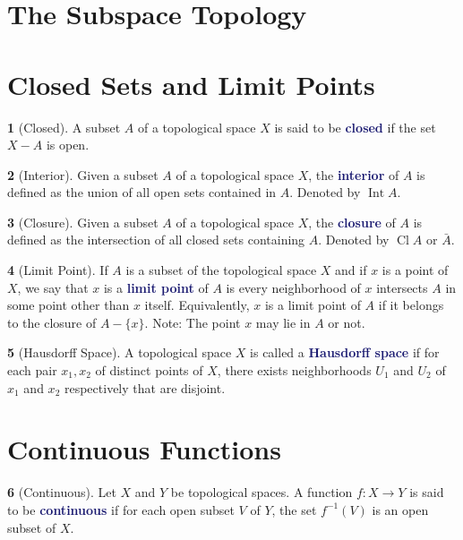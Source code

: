 \documentclass[12pt]{article}
\newcommand{\navy}[1]{\textcolor{MidnightBlue}{\bf #1}}
\theoremstyle{plain}
\theoremstyle{definition}
\newtheorem{definition}{\color{MidnightBlue}{\textbf{Definition}}}[section]
\newcommand{\1}{\mathbbm 1}
\DeclareMathOperator{\Int}{Int}
\DeclareMathOperator{\Cl}{Cl}
\begin{document}
\section{The Subspace Topology}

\section{Closed Sets and Limit Points}

\begin{definition}[Closed]
	A subset $A$ of a topological space $X$ is said to be \navy{closed} if the set $X - A$ is open.
\end{definition}

\begin{definition}[Interior]
	Given a subset $A$ of a topological space $X$, the \navy{interior} of $A$ is defined as the union of all open sets contained in $A$. Denoted by $\Int A$.
\end{definition}

\begin{definition}[Closure]
	Given a subset $A$ of a topological space $X$, the \navy{closure} of $A$ is defined as the intersection of all closed sets containing $A$. Denoted by $\Cl A$ or $\bar{A}$.
\end{definition}

\begin{definition}[Limit Point]
	If $A$ is a subset of the topological space $X$ and if $x$ is a point of $X$, we say that $x$ is a \navy{limit point} of $A$ is every neighborhood of $x$ intersects $A$ in some point other than $x$ itself. Equivalently, $x$ is a limit point of $A$ if it belongs to the closure of $A - \{x\}$. Note: The point $x$ may lie in $A$ or not.
\end{definition}

\begin{definition}[Hausdorff Space]
	A topological space $X$ is called a \navy{Hausdorff space} if for each pair $x_1, x_2$ of distinct points of $X$, there exists neighborhoods $U_1$ and $U_2$ of $x_1$ and $x_2$ respectively that are disjoint. 
\end{definition}

\section{Continuous Functions}

\begin{definition}[Continuous]
	Let $X$ and $Y$ be topological spaces. A function $f : X \to Y$ is said to be \navy{continuous} if for each open subset $V$ of $Y$, the set $f^{-1}(V)$ is an open subset of $X$.
\end{definition}
\end{document}
